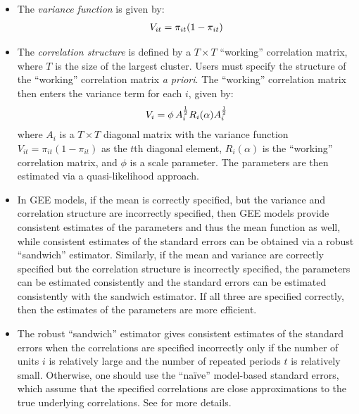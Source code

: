 \documentclass[letterpaper,10pt,english]{sphinxmanual}
\begin{document}
\begin{itemize}
\item {} 
The \emph{variance function} is given by:
\begin{gather}
\begin{split}V_{it} = \pi_{it} (1-\pi_{it})\end{split}\notag
\end{gather}
\item {} 
The \emph{correlation structure} is defined by a \(T \times T\)
“working” correlation matrix, where \(T\) is the size of the
largest cluster. Users must specify the structure of the “working”
correlation matrix \emph{a priori}. The “working” correlation matrix then
enters the variance term for each \(i\), given by:
\begin{gather}
\begin{split}V_{i} = \phi \, A_{i}^{\frac{1}{2}} R_{i}(\alpha) A_{i}^{\frac{1}{2}}\end{split}\notag
\end{gather}
where \(A_{i}\) is a \(T \times T\) diagonal matrix with the
variance function \(V_{it} = \pi_{it} (1-\pi_{it})\) as the
\(t\)th diagonal element, \(R_{i}(\alpha)\) is the
“working” correlation matrix, and \(\phi\) is a scale parameter.
The parameters are then estimated via a quasi-likelihood approach.

\item {} 
In GEE models, if the mean is correctly specified, but the variance
and correlation structure are incorrectly specified, then GEE models
provide consistent estimates of the parameters and thus the mean
function as well, while consistent estimates of the standard errors
can be obtained via a robust “sandwich” estimator. Similarly, if the
mean and variance are correctly specified but the correlation
structure is incorrectly specified, the parameters can be estimated
consistently and the standard errors can be estimated consistently
with the sandwich estimator. If all three are specified correctly,
then the estimates of the parameters are more efficient.

\item {} 
The robust “sandwich” estimator gives consistent estimates of the
standard errors when the correlations are specified incorrectly only
if the number of units \(i\) is relatively large and the number
of repeated periods \(t\) is relatively small. Otherwise, one
should use the “naïve” model-based standard errors, which assume that
the specified correlations are close approximations to the true
underlying correlations. See for more details.

\end{itemize}
\end{document}
